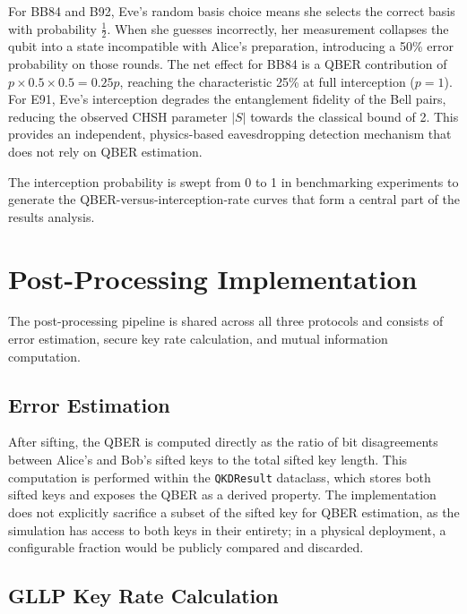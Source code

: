 \documentclass[10pt, a4paper]{report}
\begin{document}
For BB84 and B92, Eve's random basis choice means she selects the correct basis with probability $\frac{1}{2}$. When she guesses incorrectly, her measurement collapses the qubit into a state incompatible with Alice's preparation, introducing a 50\% error probability on those rounds. The net effect for BB84 is a QBER contribution of $p \times 0.5 \times 0.5 = 0.25p$, reaching the characteristic 25\% at full interception ($p = 1$). For E91, Eve's interception degrades the entanglement fidelity of the Bell pairs, reducing the observed CHSH parameter $|S|$ towards the classical bound of 2. This provides an independent, physics-based eavesdropping detection mechanism that does not rely on QBER estimation.

The interception probability is swept from 0 to 1 in benchmarking experiments to generate the QBER-versus-interception-rate curves that form a central part of the results analysis.


\section{Post-Processing Implementation}

The post-processing pipeline is shared across all three protocols and consists of error estimation, secure key rate calculation, and mutual information computation.

\subsection{Error Estimation}

After sifting, the QBER is computed directly as the ratio of bit disagreements between Alice's and Bob's sifted keys to the total sifted key length. This computation is performed within the \texttt{QKDResult} dataclass, which stores both sifted keys and exposes the QBER as a derived property. The implementation does not explicitly sacrifice a subset of the sifted key for QBER estimation, as the simulation has access to both keys in their entirety; in a physical deployment, a configurable fraction would be publicly compared and discarded.

\subsection{GLLP Key Rate Calculation}
\end{document}
